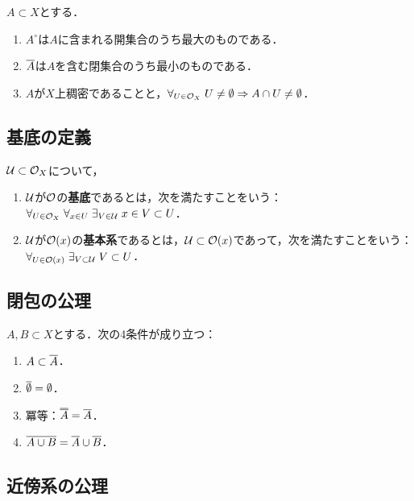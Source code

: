 \documentclass[uplatex,dvipdfmx]{jsreport}
\begin{document}
\begin{proposition}[開核，閉包，稠密性の特徴付け]
    $A\subset X$とする．
    \begin{enumerate}
        \item $A^\circ$は$A$に含まれる開集合のうち最大のものである．
        \item $\overline{A}$は$A$を含む閉集合のうち最小のものである．
        \item $A$が$X$上稠密であることと，$\forall_{U\in\mathcal{O}_X}\;U\ne\emptyset\Rightarrow A\cap U\ne\emptyset$．
    \end{enumerate}
\end{proposition}

\subsection{基底の定義}

\begin{definition}
    $\mathcal{U}\subset\mathcal{O}_X$について，
    \begin{enumerate}
        \item $\mathcal{U}$が$\mathcal{O}$の\textbf{基底}であるとは，次を満たすことをいう：$\forall_{U\in\mathcal{O}_X}\;\forall_{x\in U}\;\exists_{V\in\mathcal{U}}\;x\in V\subset U$．
        \item $\mathcal{U}$が$\mathcal{O}(x)$の\textbf{基本系}であるとは，$\mathcal{U}\subset\mathcal{O}(x)$であって，次を満たすことをいう：$\forall_{U\in\mathcal{O}(x)}\;\exists_{V\subset\mathcal{U}}\;V\subset U$．
    \end{enumerate}
\end{definition}

\subsection{閉包の公理}

\begin{proposition}
    $A,B\subset X$とする．次の4条件が成り立つ：
    \begin{enumerate}
        \item $A\subset\overline{A}$．
        \item $\overline{\emptyset}=\emptyset$．
        \item 冪等：$\oo{A}=\o{A}$．
        \item $\overline{A\cup B}=\overline{A}\cup\overline{B}$．
    \end{enumerate}
\end{proposition}

\subsection{近傍系の公理}
\end{document}
